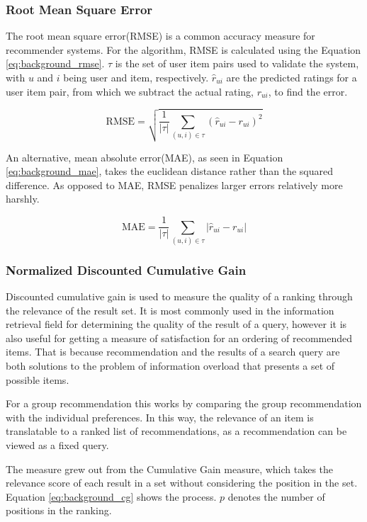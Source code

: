 \subsubsection{Root Mean Square Error}
The root mean square error(RMSE) is a common accuracy measure for recommender systems\cite{rmse}. For the algorithm, RMSE is calculated using the Equation \ref{eq:background_rmse}. $\tau$ is the set of user item pairs used to validate the system, with $u$ and $i$ being user and item, respectively. $\hat{r}_{ui}$ are the predicted ratings for a user item pair, from which we subtract the actual rating, $r_{ui}$, to find the error.

\begin{equation} \label{eq:background_rmse}
\text{RMSE} = \sqrt{\frac{1}{|\tau|}\sum_{(u,i)\in \tau}(\hat{r}_{ui}-r_{ui})^2}
\end{equation}

An alternative, mean absolute error(MAE), as seen in Equation \ref{eq:background_mae}, takes the euclidean distance rather than the squared difference\cite{rmse}. As opposed to MAE, RMSE penalizes larger errors relatively more harshly.

\begin{equation} \label{eq:background_mae}
\text{MAE} = \frac{1}{|\tau|}\sum_{(u,i)\in \tau}|\hat{r}_{ui}-r_{ui}|
\end{equation}

\subsubsection{Normalized Discounted Cumulative Gain}\label{sec:testandeval_ndcg}
Discounted cumulative gain is used to measure the quality of a ranking through the relevance of the result set. It is most commonly used in the information retrieval field for determining the quality of the result of a query, however it is also useful for getting a measure of satisfaction for an ordering of recommended items. That is because recommendation and the results of a search query are both solutions to the problem of information overload that presents a set of possible items\cite{ndcg}\cite{baltrunas}.

For a group recommendation this works by comparing the group recommendation with the individual preferences. In this way, the relevance of an item is translatable to a ranked list of recommendations, as a recommendation can be viewed as a fixed query.

The measure grew out from the Cumulative Gain measure, which takes the relevance score of each result in a set without considering the position in the set. Equation \ref{eq:background_cg} shows the process. $p$ denotes the number of positions in the ranking.

